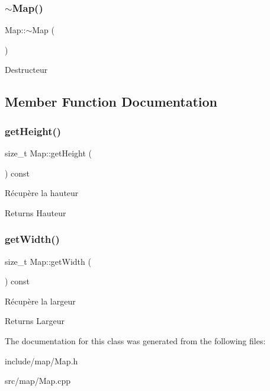 \subsubsection{\texorpdfstring{$\sim$\+Map()}{~Map()}}
{\footnotesize\ttfamily Map\+::$\sim$\+Map (\begin{DoxyParamCaption}{ }\end{DoxyParamCaption})\hspace{0.3cm}{\ttfamily [default]}}

Destructeur 

\subsection{Member Function Documentation}
\mbox{\label{classMap_a5ad6ea0107aefd0aba86b6d1053a1e97}} 
\subsubsection{\texorpdfstring{get\+Height()}{getHeight()}}
{\footnotesize\ttfamily size\+\_\+t Map\+::get\+Height (\begin{DoxyParamCaption}{ }\end{DoxyParamCaption}) const}

Récupère la hauteur \begin{DoxyReturn}{Returns}
Hauteur 
\end{DoxyReturn}
\mbox{\label{classMap_ad39fb3144a47c8e7e6256ecde71928c0}} 
\subsubsection{\texorpdfstring{get\+Width()}{getWidth()}}
{\footnotesize\ttfamily size\+\_\+t Map\+::get\+Width (\begin{DoxyParamCaption}{ }\end{DoxyParamCaption}) const}

Récupère la largeur \begin{DoxyReturn}{Returns}
Largeur 
\end{DoxyReturn}


The documentation for this class was generated from the following files\+:\begin{DoxyCompactItemize}
\item 
include/map/Map.\+h\item 
src/map/Map.\+cpp\end{DoxyCompactItemize}
